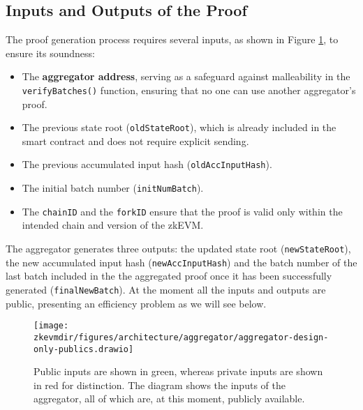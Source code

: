 \subsection{Inputs and Outputs of the Proof}

The proof generation process requires several inputs, as shown in Figure \ref{fig:aggregator-only-publics}, to ensure its soundness:

\begin{itemize}

\item The \textbf{aggregator address}, serving as a safeguard against malleability in the \texttt{verifyBatches()} function, ensuring that no one can use another aggregator's proof.

\item The previous state root (\texttt{oldStateRoot}), which is already included in the smart contract and does not require explicit sending.

\item The previous accumulated input hash (\texttt{oldAccInputHash}).

\item The initial batch number (\texttt{initNumBatch}).

\item The \texttt{chainID} and the \texttt{forkID} ensure that the proof is valid only within the intended chain and version of the zkEVM.


\end{itemize}


The aggregator generates three outputs: the updated state root (\texttt{newStateRoot}), the new accumulated input hash (\texttt{newAccInputHash}) and the batch number of the last batch included in the the aggregated proof once it has been successfully generated (\texttt{finalNewBatch}). At the moment all the inputs and outputs are public, presenting an efficiency problem as we will see below.


\begin{figure}[h]
\centering
\texttt{[image: \\zkevmdir/figures/architecture/aggregator/aggregator-design-only-publics.drawio]}
\caption{Public inputs are shown in green, whereas private inputs are shown in red for distinction. The diagram shows the inputs of the aggregator, all of which are, at this moment, publicly available. }
\label{fig:aggregator-only-publics}
\end{figure}


